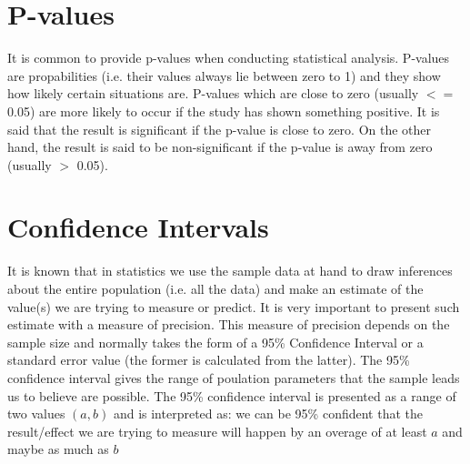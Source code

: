 \documentclass[a4paper,12pt, english]{article}
\begin{document}

\section{P-values}
It is common to provide p-values when conducting statistical analysis. P-values are propabilities (i.e. their values always lie between zero to 1) and they show how likely certain situations are. P-values which are close to zero (usually $<=$ 0.05) are more likely to occur if the study has shown something positive. It is said that the result is significant if the p-value is close to zero. On the other hand, the result is said to be non-significant if the p-value is away from zero (usually $>$ 0.05).

\section{Confidence Intervals}
It is known that in statistics we use the sample data at hand to draw inferences about the entire population (i.e. all the data) and make an estimate of the value(s) we are trying to measure or predict. It is very important to present such estimate with a measure of precision. This measure of precision depends on the sample size and normally takes the form of a 95\% Confidence Interval or a standard error value (the former is calculated from the latter). The 95\% confidence interval gives the range of poulation parameters that the sample leads us to believe are possible. 
The 95\% confidence interval is presented as a range of two values $(a,b)$ and is interpreted as: we can be 95\% confident that the result/effect we are trying to measure will happen by an overage of at least $a$ and maybe as much as $b$
\end{document}
